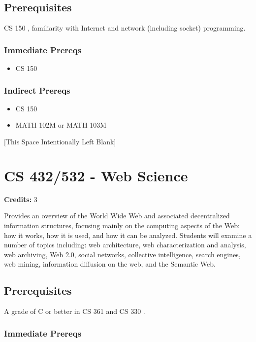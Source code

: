 \documentclass[]{article}
\providecommand{\tightlist}{%
  \setlength{\itemsep}{0pt}\setlength{\parskip}{0pt}}
\newcommand{\pagebreakhere}{
\vspace*{\fill}
\begin{center}
[This Space Intentionally Left Blank]
\end{center}
\vspace*{\fill}
\newpage
}
\begin{document}
\subsection{Prerequisites}\label{prerequisites-30}

CS 150 , familiarity with Internet and network (including socket)
programming.

\subsubsection{Immediate Prereqs}\label{immediate-prereqs-22}

\begin{itemize}
\tightlist
\item
  CS 150
\end{itemize}

\subsubsection{Indirect Prereqs}\label{indirect-prereqs-22}

\begin{itemize}
\tightlist
\item
  CS 150
\item
  MATH 102M or MATH 103M
\end{itemize}

\pagebreakhere
\section{CS 432/532 - Web Science}\label{cs-432532---web-science}

\textbf{Credits:} 3

Provides an overview of the World Wide Web and associated decentralized
information structures, focusing mainly on the computing aspects of the
Web: how it works, how it is used, and how it can be analyzed. Students
will examine a number of topics including: web architecture, web
characterization and analysis, web archiving, Web 2.0, social networks,
collective intelligence, search engines, web mining, information
diffusion on the web, and the Semantic Web.

\subsection{Prerequisites}\label{prerequisites-31}

A grade of C or better in CS 361 and CS 330 .

\subsubsection{Immediate Prereqs}\label{immediate-prereqs-23}
\end{document}
